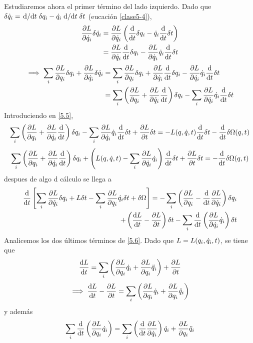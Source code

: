 Estudiaremos ahora el primer término del lado izquierdo. Dado que $\delta\dot{q}_i=\dv*{t}\delta q_i-\dot{q}_i\dv*{t}\delta t$ (eucación \eqref{clase5-4}),
\begin{align}
  \pdv{L}{\dot{q}_i}\delta \dot{q}_i&=\pdv{L}{\dot{q}_i}\left(\dv{t}\delta q_i-\dot{q}_i\dv{t}\delta t\right)\\
  &=\pdv{L}{\dot{q}_i}\dv{t}\delta q_i-\pdv{L}{\dot{q}_i}\dot{q}_i\dv{t}\delta t
\end{align}
\begin{align}
  \implies \sum_i\pdv{L}{q_i}\delta q_i+\pdv{L}{\dot{q}_i}\delta \dot{q}_i&=\sum_i\pdv{L}{q_i}\delta q_i+\pdv{L}{\dot{q}_i}\dv{t}\delta q_i-\pdv{L}{\dot{q}_i}\dot{q}_i\dv{t}\delta t\\
  &=\sum_i\left(\pdv{L}{q_i}+\pdv{L}{\dot{q}_i}\dv{t}\right)\delta q_i-\sum_i\pdv{L}{\dot{q}_i}\dot{q}_i\dv{t}\delta t
\end{align}
Introduciendo en \eqref{5.5},
\begin{equation}
  \sum_i\left(\pdv{L}{q_i}+\pdv{L}{\dot{q}_i}\dv{t}\right)\delta q_i-\sum_i\pdv{L}{\dot{q}_i}\dot{q}_i\dv{t}\delta t+\pdv{L}{t}\delta t=-L(q,\dot{q},t)\dv{t}\delta t-\dv{t}\delta \Omega(q,t)
 \end{equation}
 \begin{equation}
  \sum_i\left(\pdv{L}{q_i}+\pdv{L}{\dot{q}_i}\dv{t}\right)\delta q_i+\left(L(q,\dot{q},t)-\sum_i\pdv{L}{\dot{q}_i}\dot{q}_i\right)\dv{t}\delta t+\pdv{L}{t}\delta t=-\dv{t}\delta \Omega(q,t)
\end{equation}
despues de algo d cálculo se llega a 
\begin{equation}\label{5.6}
\begin{split}
  \dv{t}\left[\sum_i\pdv{L}{\dot{q}_i}\delta q_i+L\delta t-\sum_i\pdv{L}{q_i}\dot{q}_i\delta t+\delta \Omega\right]=-\sum_i\left(\pdv{L}{q_i}-\dv{t}\pdv{L}{\dot{q}_i}\right)\delta q_i \\ +\left(\dv{L}{t}-\pdv{L}{t}\right)\delta t-\sum_i\dv{t}\left(\pdv{L}{\dot{q}_i}\dot{q}_i\right)\delta t
 \end{split}
\end{equation}
Analicemos los dos últimos términos de \eqref{5.6}. Dado que $L=L(q_i,\dot{q}_i,t)$, se tiene que
\begin{equation}
  \dv{L}{t}=\sum_i\left(\pdv{L}{q_i}\dot{q}_i+\pdv{L}{q_i}\ddot{q}_i\right)+\pdv{L}{t}
\end{equation}
\begin{equation}
  \implies \dv{L}{t}-\pdv{L}{t}=\sum_i\left(\pdv{L}{q_i}\dot{q}_i+\pdv{L}{q_i}\ddot{q}_i\right)
\end{equation}
y además
\begin{equation}
  \sum_i\dv{t}\left(\pdv{L}{q_i}\dot{q}_i\right)=\sum_i\left(\dv{t}\pdv{L}{\dot{q}_i}\right)\dot{q}_i+\pdv{L}{q_i}\ddot{q}_i
\end{equation}
